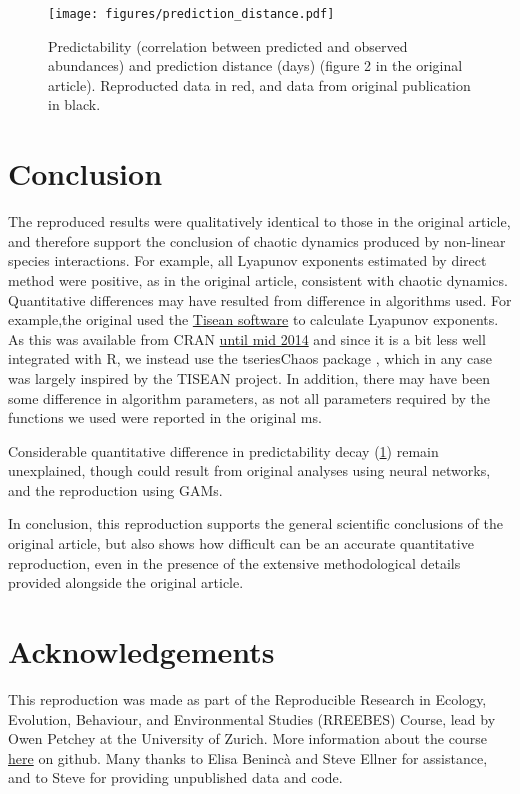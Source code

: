 \documentclass[10pt,a4paper,onecolumn]{article}
\renewcommand{\includegraphics}[2][]{\OldIncludegraphics[width=12cm, #1]{#2}}
\begin{document}
\begin{figure}[htbp]
\centering
\texttt{[image: figures/prediction\_distance.pdf]}
\caption{\label{fig:prediction_distance}Predictability (correlation
between predicted and observed abundances) and prediction distance
(days) (figure 2 in the original article). Reproducted data in red, and
data from original publication in black.}
\end{figure}

\section{Conclusion}\label{conclusion}

The reproduced results were qualitatively identical to those in the
original article, and therefore support the conclusion of chaotic
dynamics produced by non-linear species interactions. For example, all
Lyapunov exponents estimated by direct method were positive, as in the
original article, consistent with chaotic dynamics. Quantitative
differences may have resulted from difference in algorithms used. For
example,the original used the
\href{http://www.mpipks-dresden.mpg.de/~tisean/}{Tisean software} to
calculate Lyapunov exponents. As this was available from CRAN
\href{http://cran.r-project.org/web/packages/RTisean/index.html}{until
mid 2014} and since it is a bit less well integrated with R, we instead
use the tseriesChaos package \textcite{tseriesChaos}, which in any case
was largely inspired by the TISEAN project. In addition, there may have
been some difference in algorithm parameters, as not all parameters
required by the functions we used were reported in the original ms.

Considerable quantitative difference in predictability decay
(\ref{fig:prediction_distance}) remain unexplained, though could result
from original analyses using neural networks, and the reproduction using
GAMs.

In conclusion, this reproduction supports the general scientific
conclusions of the original article, but also shows how difficult can be
an accurate quantitative reproduction, even in the presence of the
extensive methodological details provided alongside the original
article.

\section{Acknowledgements}\label{acknowledgements}

This reproduction was made as part of the Reproducible Research in
Ecology, Evolution, Behaviour, and Environmental Studies (RREEBES)
Course, lead by Owen Petchey at the University of Zurich. More
information about the course
\href{https://github.com/opetchey/RREEBES/blob/master/README.md}{here}
on github. Many thanks to Elisa Benincà and Steve Ellner for assistance,
and to Steve for providing unpublished data and code.

{\sffamily \small
  \printbibliography[title=References]
}
\end{document}
